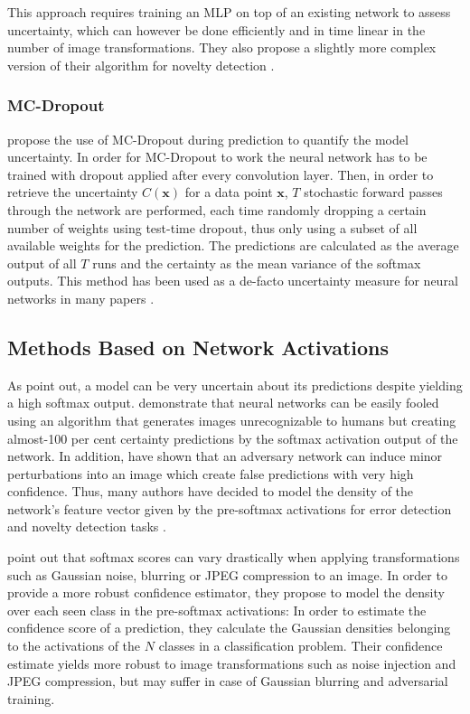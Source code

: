 \documentclass[10pt]{article}
\begin{document}
This approach requires training an \gls{MLP} on top of an existing network to assess uncertainty, which can however be done efficiently and in time linear in the number of image transformations. They also propose a slightly more complex version of their algorithm for novelty detection \cite{Bahat_2018}.

\subsubsection{MC-Dropout}
\textcite{ghahramani} propose the use of \gls{MC-Dropout} during prediction to quantify the model uncertainty. In order for \gls{MC-Dropout} to work the neural network has to be trained with dropout applied after every convolution layer. Then, in order to retrieve the uncertainty $C(\mathbf{x})$ for a data point $\mathbf{x}$,  $T$ stochastic forward passes through the network are performed, each time randomly dropping a certain number of weights using test-time dropout, thus only using a subset of all available weights for the prediction. The predictions are calculated as the average output of all $T$ runs and the certainty as the mean variance of the softmax outputs. This method has been used as a de-facto uncertainty measure for neural networks in many papers \cite{mandelbaum17, leibig2017, Lakshminarayanan16, subramanya, Kampffmeyer2016SemanticSO}.

\subsection{Methods Based on Network Activations}
\label{subsec:pre-softmax}
As \textcite{ghahramani} point out, a model can be very uncertain about its predictions despite yielding a high softmax output. \textcite{NguyenYC14} demonstrate that neural networks can be easily fooled using an algorithm that generates images unrecognizable to humans but creating almost-100 per cent certainty predictions by the softmax activation output of the network. In addition, \textcite{Goodfellow2014} have shown that an adversary network can induce minor perturbations into an image which create false predictions with very high confidence. Thus, many authors have decided to model the density of the network's feature vector given by the pre-softmax activations for error detection and novelty detection tasks \cite{subramanya, mandelbaum17, Bishop1994NoveltyDA}.

\textcite{subramanya} point out that softmax scores can vary drastically when applying transformations such as Gaussian noise, blurring or JPEG compression to an image. In order to provide a more robust confidence estimator, they propose to model the density over each seen class in the pre-softmax activations: In order to estimate the confidence score of a prediction, they calculate the Gaussian densities belonging to the activations of the $N$ classes in a classification problem. Their confidence estimate yields more robust to image transformations such as noise injection and JPEG compression, but may suffer in case of Gaussian blurring and adversarial training.
\end{document}
